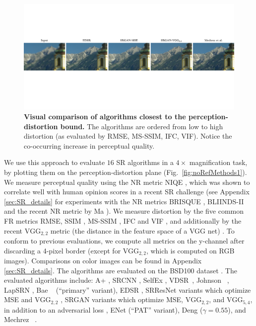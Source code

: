 \begin{figure}
	\begin{center}
		\includegraphics[width=\linewidth,trim={0 9cm 0 8.4cm},clip]{figures/church6.pdf}
	\end{center}
	\caption{\textbf{Visual comparison of algorithms closest to the perception-distortion bound.} The algorithms are ordered from low to high distortion (as evaluated by RMSE, MS-SSIM, IFC, VIF). Notice the co-occurring increase in perceptual quality.}
	\label{fig:comparison1}
\end{figure}

We use this approach to evaluate $16$ SR algorithms in a $4\times$ magnification task, by plotting them on the perception-distortion plane (Fig.~\ref{fig:noRefMethods1}). We measure perceptual quality using the NR metric NIQE \cite{mittal2013making}, which was shown to correlate well with human opinion scores in a recent SR challenge \cite{blau2018pirm} (see Appendix \ref{sec:SR_details} for experiments with the NR metrics  BRISQUE \cite{mittal2012no}, BLIINDS-II \cite{saad2012blind} and the recent NR metric by Ma \etal \cite{ma2017learning}). We measure distortion by the five common FR metrics RMSE, SSIM \cite{wang2004image}, MS-SSIM \cite{wang2003multiscale}, IFC \cite{sheikh2005information} and VIF \cite{sheikh2006image}, and additionally by the recent $\text{VGG}_{2,2}$ metric (the distance in the feature space of a VGG net) \cite{ledig2016photo,johnson2016perceptual}. To conform to previous evaluations, we compute all metrics on the y-channel after discarding a 4-pixel border (except for VGG$_{2,2}$, which is computed on RGB images). Comparisons on color images can be found in Appendix \ref{sec:SR_details}. The algorithms are evaluated on the BSD100 dataset \cite{martin2001database}. The evaluated algorithms include: A+ \cite{timofte2014a+}, SRCNN \cite{dong2014learning}, SelfEx \cite{huang2015single}, VDSR~\cite{kim2016accurate}, Johnson \etal~\cite{johnson2016perceptual}, LapSRN \cite{lai2017deep}, Bae \etal~\cite{bae2017beyond} (``primary'' variant), EDSR \cite{lim2017enhanced}, SRResNet variants which optimize MSE and $\text{VGG}_{2,2}$ \cite{ledig2016photo}, SRGAN variants which optimize MSE, $\text{VGG}_{2,2}$, and $\text{VGG}_{5,4}$, in addition to an adversarial loss \cite{ledig2016photo}, ENet \cite{sajjadi2017enhancenet} (``PAT'' variant), Deng \cite{deng2018enhancing} ($\gamma=0.55$), and Mechrez \etal~\cite{Mechrez2018SR}.


